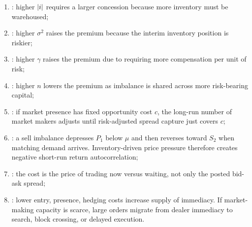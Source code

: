 \begin{model}
\par\smallskip\noindent{}
\begin{enumerate}[label=\roman*.]
\setlength{\itemsep}{0pt}
\item {}: higher $\left\lvert i\right\rvert$ requires a larger concession because more inventory must be warehoused;
\item {}: higher $\sigma^2$ raises the premium because the interim inventory position is riskier;
\item {}: higher $\gamma$ raises the premium due to requiring more compensation per unit of risk;
\item {}: higher $n$ lowers the premium as imbalance is shared across more risk-bearing capital;
\item {}: if market presence has fixed opportunity cost $c$, the long-run number of market makers adjusts until risk-adjusted spread capture just covers $c$;
\item {}: a sell imbalance depresses $P_1$ below $\mu$ and then reverses toward $S_2$ when matching demand arrives. Inventory-driven price pressure therefore creates negative short-run return autocorrelation;
\item {}: the cost is the price of trading now versus waiting, not only the posted bid-ask spread;
\item {}: lower entry, presence, hedging costs increase supply of immediacy. If market-making capacity is scarce, large orders migrate from dealer immediacy to search, block crossing, or delayed execution.
\end{enumerate}


\end{model}
